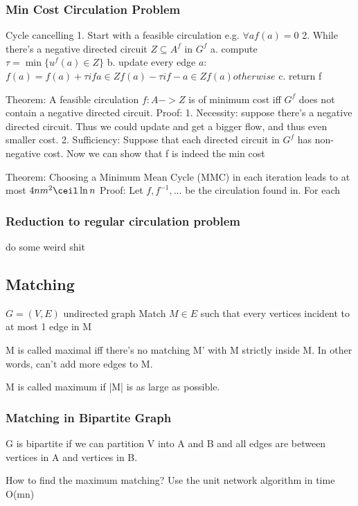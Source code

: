 \documentclass{article}
\begin{document}
\subsubsection{Min Cost Circulation Problem}
Cycle cancelling
1. Start with a feasible circulation e.g. $\forall a f(a) = 0$
2. While there's a negative directed circuit $Z\subseteq A^f$ in $G^f$
   a. compute $\tau = \min \{u^f(a) \in Z\}$
   b. update every edge $a$: $f(a) = f(a) + \tau if a \in Z f(a) - \tau if -a \in Z f(a) otherwise$
   c. return f

Theorem: A feasible circulation $f: A -> Z$ is of minimum cost iff
$G^f$ does not contain a negative directed circuit.
Proof:
1. Necessity: suppose there's a negative directed circuit. Thus we
could update and get a bigger flow, and thus even smaller cost.
2. Sufficiency: Suppose that each directed circuit in $G^f$ has non-negative cost.  Now we can show that f is indeed the min cost

Theorem: Choosing a Minimum Mean Cycle (MMC) in each iteration leads to at most $4nm^2\ceil \ln n$
Proof:
Let $f, f^{-1},\ldots$ be the circulation found in.  For each 

\subsubsection{Reduction to regular circulation problem}
do some weird shit



\subsection{Matching}
$G=(V,E)$ undirected graph
Match $M\in E$ such that every vertices incident to at most 1 edge in M

M is called maximal iff there's no matching M' with M strictly inside M.  In
other words, can't add more edges to M.

M is called maximum if |M| is as large as possible.

\subsubsection{Matching in Bipartite Graph}
G is bipartite if we can partition V into A and B and all edges are between
vertices in A and vertices in B.

How to find the maximum matching?  Use the unit network algorithm in time
O(m\sqrt n)
\end{document}
